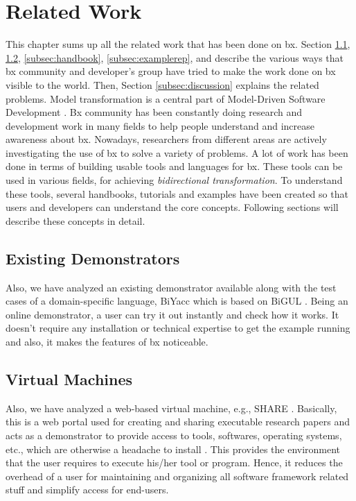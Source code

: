 \section{Related Work}\label{sec:relatedwork}
This chapter sums up all the related work that has been done on bx. Section \ref{subsec:existingdemo}, \ref{subsec:virtualmachines}, \ref{subsec:handbook}, \ref{subsec:examplerep},  and  describe the various ways that bx community and developer's group have tried to make the work done on bx visible to the world. Then, Section \ref{subsec:discussion} explains the related problems. 
\newline\newline Model transformation is a central part of Model-Driven Software Development \cite{bx-grace} \cite{bx-dagstuhl}. Bx community has been constantly doing research and development work in many fields to help people understand and increase awareness about bx. Nowadays, researchers from different areas are actively investigating the use of bx to solve a variety of problems. A lot of work has been done in terms of building usable tools and languages for bx. These tools can be used in various fields, for achieving \textit{bidirectional transformation}. To understand these tools, several handbooks, tutorials and examples have been created so that users and developers can understand the core concepts. Following sections will describe these concepts in detail.
\subsection{Existing Demonstrators}\label{subsec:existingdemo}
Also, we have analyzed an existing demonstrator available along with the test cases of a domain-specific language, BiYacc \cite{biyacc} which is based on BiGUL \cite{bigul}. 
\newline\newline Being an online demonstrator, a user can try it out instantly and check how it works. It doesn't require any installation or technical expertise to get the example running and also, it makes the features of bx noticeable.

\subsection{Virtual Machines}\label{subsec:virtualmachines}
Also, we have analyzed a web-based virtual machine, e.g., SHARE \cite{share}. Basically, this is a web portal used for creating and sharing executable research papers and acts as a demonstrator to provide access to tools, softwares, operating systems, etc., which are otherwise a headache to install \cite{share}. 
\newline\newline This provides the environment that the user requires to execute his/her tool or program. Hence, it reduces the overhead of a user for maintaining and organizing all software framework related stuff and simplify access for end-users.

